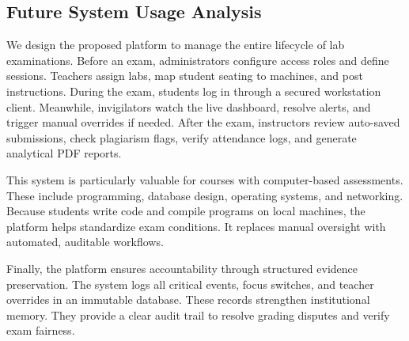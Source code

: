 \subsection{Future System Usage Analysis}
We design the proposed platform to manage the entire lifecycle of lab examinations. Before an exam, administrators configure access roles and define sessions. Teachers assign labs, map student seating to machines, and post instructions. During the exam, students log in through a secured workstation client. Meanwhile, invigilators watch the live dashboard, resolve alerts, and trigger manual overrides if needed. After the exam, instructors review auto-saved submissions, check plagiarism flags, verify attendance logs, and generate analytical PDF reports.

This system is particularly valuable for courses with computer-based assessments. These include programming, database design, operating systems, and networking. Because students write code and compile programs on local machines, the platform helps standardize exam conditions. It replaces manual oversight with automated, auditable workflows.

Finally, the platform ensures accountability through structured evidence preservation. The system logs all critical events, focus switches, and teacher overrides in an immutable database. These records strengthen institutional memory. They provide a clear audit trail to resolve grading disputes and verify exam fairness.